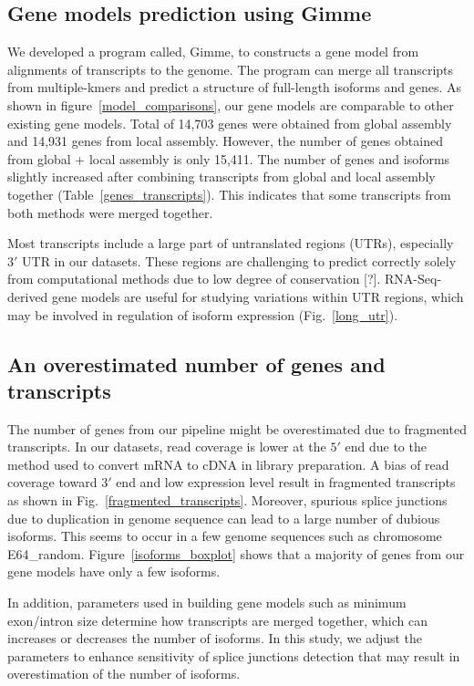 \documentclass[10pt]{article}
\begin{document}
\subsection*{Gene models prediction using Gimme}

We developed a program called, Gimme, to constructs a gene model from alignments of transcripts to the genome.
The program can merge all transcripts from multiple-kmers and predict a structure of full-length isoforms and genes.
As shown in figure~\ref{model_comparisons}, our gene models are comparable to other existing gene models.
Total of 14,703 genes were obtained from global assembly and 14,931 genes from local assembly.
However, the number of genes obtained from global + local assembly is only 15,411.
The number of genes and isoforms slightly increased after combining transcripts from global and local
assembly together (Table~\ref{genes_transcripts}). 
This indicates that some transcripts from both methods were merged together.

Most transcripts include a large part of untranslated regions (UTRs), especially $3'$ UTR in our datasets.
These regions are challenging to predict correctly solely from computational methods due to low degree of conservation [?].
RNA-Seq-derived gene models are useful for studying variations within UTR regions, which may be involved in regulation of isoform expression\cite{} (Fig.~\ref{long_utr}).


\subsection*{An overestimated number of genes and transcripts}
The number of genes from our pipeline might be overestimated due to fragmented transcripts.
In our datasets, read coverage is lower at the $5'$ end due to the method used to convert mRNA to cDNA
in library preparation.
A bias of read coverage toward $3'$ end and low expression level result in fragmented transcripts as shown in Fig.~\ref{fragmented_transcripts}.
Moreover, spurious splice junctions due to duplication in genome sequence can lead to a large number of dubious isoforms.
This seems to occur in a few genome sequences such as chromosome E64\_random.
Figure~\ref{isoforms_boxplot} shows that a majority of genes from our gene models have only a few isoforms.

In addition, parameters used in building gene models such as minimum exon/intron size determine how transcripts are merged together, which can increases or decreases the number of isoforms.
In this study, we adjust the parameters to enhance sensitivity of splice junctions detection that may result in overestimation of the number of isoforms.
\end{document}
